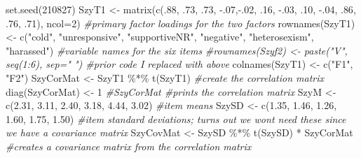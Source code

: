 \documentclass[
  english,
]{book}
\newenvironment{Shaded}{\begin{snugshade}}{\end{snugshade}}
\newcommand{\AttributeTok}[1]{\textcolor[rgb]{0.77,0.63,0.00}{#1}}
\newcommand{\CommentTok}[1]{\textcolor[rgb]{0.56,0.35,0.01}{\textit{#1}}}
\newcommand{\DecValTok}[1]{\textcolor[rgb]{0.00,0.00,0.81}{#1}}
\newcommand{\FloatTok}[1]{\textcolor[rgb]{0.00,0.00,0.81}{#1}}
\newcommand{\FunctionTok}[1]{\textcolor[rgb]{0.00,0.00,0.00}{#1}}
\newcommand{\NormalTok}[1]{#1}
\newcommand{\OtherTok}[1]{\textcolor[rgb]{0.56,0.35,0.01}{#1}}
\newcommand{\SpecialCharTok}[1]{\textcolor[rgb]{0.00,0.00,0.00}{#1}}
\newcommand{\StringTok}[1]{\textcolor[rgb]{0.31,0.60,0.02}{#1}}
\begin{document}
\begin{Shaded}
\begin{Highlighting}[]
\FunctionTok{set.seed}\NormalTok{(}\DecValTok{210827}\NormalTok{)}
\NormalTok{SzyT1 }\OtherTok{\textless{}{-}} \FunctionTok{matrix}\NormalTok{(}\FunctionTok{c}\NormalTok{(.}\DecValTok{88}\NormalTok{, .}\DecValTok{73}\NormalTok{, .}\DecValTok{73}\NormalTok{, }\SpecialCharTok{{-}}\NormalTok{.}\DecValTok{07}\NormalTok{,}\SpecialCharTok{{-}}\NormalTok{.}\DecValTok{02}\NormalTok{, .}\DecValTok{16}\NormalTok{, }\SpecialCharTok{{-}}\NormalTok{.}\DecValTok{03}\NormalTok{, .}\DecValTok{10}\NormalTok{, }\SpecialCharTok{{-}}\NormalTok{.}\DecValTok{04}\NormalTok{, .}\DecValTok{86}\NormalTok{, .}\DecValTok{76}\NormalTok{, .}\DecValTok{71}\NormalTok{), }\AttributeTok{ncol=}\DecValTok{2}\NormalTok{) }\CommentTok{\#primary factor loadings for the two factors}
\FunctionTok{rownames}\NormalTok{(SzyT1) }\OtherTok{\textless{}{-}} \FunctionTok{c}\NormalTok{(}\StringTok{"cold"}\NormalTok{, }\StringTok{"unresponsive"}\NormalTok{, }\StringTok{"supportiveNR"}\NormalTok{, }\StringTok{"negative"}\NormalTok{, }\StringTok{"heterosexism"}\NormalTok{, }\StringTok{"harassed"}\NormalTok{) }\CommentTok{\#variable names for the six items}
\CommentTok{\#rownames(Szyf2) \textless{}{-} paste("V", seq(1:6), sep=" ") \#prior code I replaced with above}
\FunctionTok{colnames}\NormalTok{(SzyT1) }\OtherTok{\textless{}{-}} \FunctionTok{c}\NormalTok{(}\StringTok{"F1"}\NormalTok{, }\StringTok{"F2"}\NormalTok{)}
\NormalTok{SzyCorMat }\OtherTok{\textless{}{-}}\NormalTok{ SzyT1 }\SpecialCharTok{\%*\%} \FunctionTok{t}\NormalTok{(SzyT1) }\CommentTok{\#create the correlation matrix}
\FunctionTok{diag}\NormalTok{(SzyCorMat) }\OtherTok{\textless{}{-}} \DecValTok{1}
\CommentTok{\#SzyCorMat \#prints the correlation matrix}
\NormalTok{SzyM }\OtherTok{\textless{}{-}} \FunctionTok{c}\NormalTok{(}\FloatTok{2.31}\NormalTok{, }\FloatTok{3.11}\NormalTok{, }\FloatTok{2.40}\NormalTok{, }\FloatTok{3.18}\NormalTok{, }\FloatTok{4.44}\NormalTok{, }\FloatTok{3.02}\NormalTok{) }\CommentTok{\#item means}
\NormalTok{SzySD }\OtherTok{\textless{}{-}} \FunctionTok{c}\NormalTok{(}\FloatTok{1.35}\NormalTok{, }\FloatTok{1.46}\NormalTok{, }\FloatTok{1.26}\NormalTok{, }\FloatTok{1.60}\NormalTok{, }\FloatTok{1.75}\NormalTok{, }\FloatTok{1.50}\NormalTok{) }\CommentTok{\#item standard deviations; turns out we won\textquotesingle{}t need these since we have a covariance matrix}
\NormalTok{SzyCovMat }\OtherTok{\textless{}{-}}\NormalTok{ SzySD }\SpecialCharTok{\%*\%} \FunctionTok{t}\NormalTok{(SzySD) }\SpecialCharTok{*}\NormalTok{ SzyCorMat }\CommentTok{\#creates a covariance matrix from the correlation matrix}

\end{Highlighting}
\end{Shaded}
\end{document}
